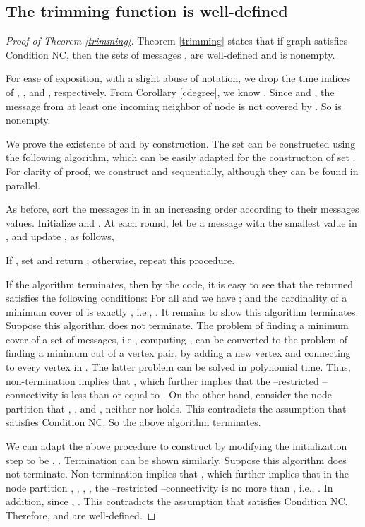 \documentclass[letterpaper, 11pt]{article}
\begin{document}
\subsection{The trimming function is well-defined}
\label{trimmingProof}
\begin{proof}[Proof of Theorem \ref{trimming}]
Theorem \ref{trimming} states that if graph  satisfies Condition NC, then the sets of messages ,  are well-defined and   is nonempty.



For ease of exposition, with a slight abuse of notation, we drop the time indices of , ,  and , respectively.
From Corollary \ref{cdegree}, we know . Since  and , the message from at least one incoming neighbor of node  is not covered by . So  is nonempty. 


We prove the existence of  and  by construction. The set  can be constructed using the following algorithm, which can be easily adapted for the construction of set . For clarity of proof, we construct  and  sequentially, although they can be found in parallel.

As before, sort the messages in  in an increasing order according to their messages values. Initialize  and . At each round, let  be a message with the smallest value in , and update ,  as follows,

If , set  and return ; otherwise, repeat this procedure.

If the algorithm terminates, then by the code, it is easy to see that the returned  satisfies the following conditions: For all  and  we have ;
and the cardinality of a minimum cover of  is exactly , i.e., .
It remains to show this algorithm terminates. Suppose this algorithm does not terminate.
The problem of finding a minimum cover of a set of messages, i.e., computing , can be converted to the problem of finding a minimum cut of a vertex pair, by adding a new vertex  and connecting  to every vertex in . The latter problem can be solved in polynomial time. Thus, non-termination implies that , which further implies that
the --restricted --connectivity is less than or equal to . On the other hand, consider the node partition that , , and , neither  nor  holds. This contradicts the assumption that  satisfies Condition NC. So the above algorithm terminates.

We can adapt the above procedure to construct  by modifying the initialization step to be ,  .
Termination can be shown similarly. Suppose this algorithm does not terminate. Non-termination implies that , which further implies that in the node partition , , , , the --restricted --connectivity is no more than , i.e., . In addition, since , . This contradicts the assumption that  satisfies Condition NC.
Therefore,  and  are well-defined.


\end{proof}
\end{document}
